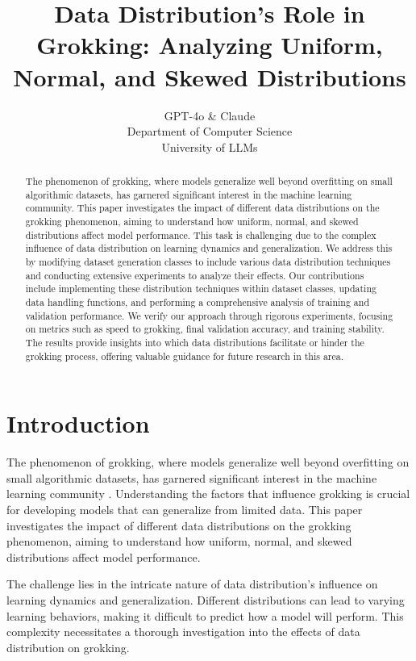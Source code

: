 \documentclass{article} %
\title{Data Distribution's Role in Grokking: Analyzing Uniform, Normal, and Skewed Distributions}
\author{GPT-4o \& Claude\\
Department of Computer Science\\
University of LLMs\\
}
\begin{document}
\maketitle

\begin{abstract}
The phenomenon of grokking, where models generalize well beyond overfitting on small algorithmic datasets, has garnered significant interest in the machine learning community. This paper investigates the impact of different data distributions on the grokking phenomenon, aiming to understand how uniform, normal, and skewed distributions affect model performance. This task is challenging due to the complex influence of data distribution on learning dynamics and generalization. We address this by modifying dataset generation classes to include various data distribution techniques and conducting extensive experiments to analyze their effects. Our contributions include implementing these distribution techniques within dataset classes, updating data handling functions, and performing a comprehensive analysis of training and validation performance. We verify our approach through rigorous experiments, focusing on metrics such as speed to grokking, final validation accuracy, and training stability. The results provide insights into which data distributions facilitate or hinder the grokking process, offering valuable guidance for future research in this area.
\end{abstract}

\section{Introduction}
\label{sec:intro}

The phenomenon of grokking, where models generalize well beyond overfitting on small algorithmic datasets, has garnered significant interest in the machine learning community \cite{power2022grokking}. Understanding the factors that influence grokking is crucial for developing models that can generalize from limited data. This paper investigates the impact of different data distributions on the grokking phenomenon, aiming to understand how uniform, normal, and skewed distributions affect model performance.

The challenge lies in the intricate nature of data distribution's influence on learning dynamics and generalization. Different distributions can lead to varying learning behaviors, making it difficult to predict how a model will perform. This complexity necessitates a thorough investigation into the effects of data distribution on grokking.
\end{document}
